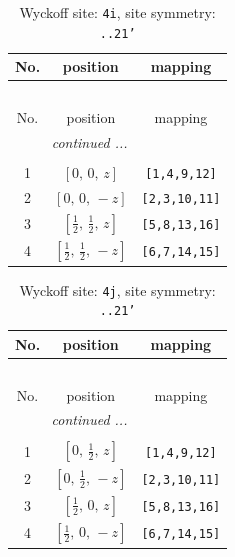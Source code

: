 \documentclass[fleqn,8pt]{jsarticle}
\begin{document}
\renewcommand{\arraystretch}{1.2}
\begin{longtable}{ccc}
\caption{Wyckoff site: {\tt 4i}, site symmetry: {\tt ..21'}}
 \\
 \hline \hline
No. & position & mapping \\ \hline \endfirsthead

\multicolumn{2}{l}{\tablename\ \thetable{}} \\
 \hline \hline
No. & position & mapping \\ \hline \endhead

 \hline \hline
\multicolumn{2}{r}{\footnotesize\it continued ...} \\ \endfoot

 \hline \hline
\multicolumn{2}{r}{} \\ \endlastfoot

1 & $\left[ 0,\, 0,\, z \right]$ & {\tt [1,4,9,12]} \\ \hline
2 & $\left[ 0,\, 0,\, - z \right]$ & {\tt [2,3,10,11]} \\ \hline
3 & $\left[ \frac{1}{2},\, \frac{1}{2},\, z \right]$ & {\tt [5,8,13,16]} \\ \hline
4 & $\left[ \frac{1}{2},\, \frac{1}{2},\, - z \right]$ & {\tt [6,7,14,15]} \\
\end{longtable}
\renewcommand{\arraystretch}{1.2}
\begin{longtable}{ccc}
\caption{Wyckoff site: {\tt 4j}, site symmetry: {\tt ..21'}}
 \\
 \hline \hline
No. & position & mapping \\ \hline \endfirsthead

\multicolumn{2}{l}{\tablename\ \thetable{}} \\
 \hline \hline
No. & position & mapping \\ \hline \endhead

 \hline \hline
\multicolumn{2}{r}{\footnotesize\it continued ...} \\ \endfoot

 \hline \hline
\multicolumn{2}{r}{} \\ \endlastfoot

1 & $\left[ 0,\, \frac{1}{2},\, z \right]$ & {\tt [1,4,9,12]} \\ \hline
2 & $\left[ 0,\, \frac{1}{2},\, - z \right]$ & {\tt [2,3,10,11]} \\ \hline
3 & $\left[ \frac{1}{2},\, 0,\, z \right]$ & {\tt [5,8,13,16]} \\ \hline
4 & $\left[ \frac{1}{2},\, 0,\, - z \right]$ & {\tt [6,7,14,15]} \\
\end{longtable}
\end{document}
